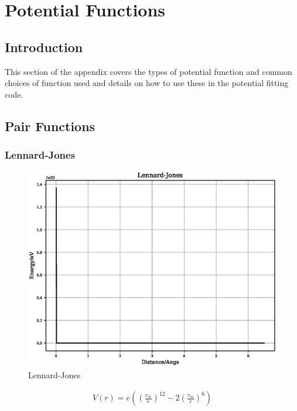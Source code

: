 \chapter{Potential Functions}

\FloatBarrier
\section{Introduction}

This section of the appendix covers the types of potential function and common choices of function used and details on how to use these in the potential fitting code.


\clearpage
\FloatBarrier
\section{Pair Functions}



\FloatBarrier
\subsection{Lennard-Jones}

\begin{figure}[h]
  \begin{center}
    \includegraphics[width=120mm]{appendix/functions/plots/lennard_jones.eps}
    \caption{Lennard-Jones}
    \label{graph:LennardJones}
  \end{center}
\end{figure}

\begin{equation}
\begin{split}
V(r) = e \left(\left(\frac{r_m}{r}\right)^12 - 2 \left(\frac{r_m}{r}\right)^6\right)
\end{split}
\label{eq:eqLennardJones}
\end{equation}

